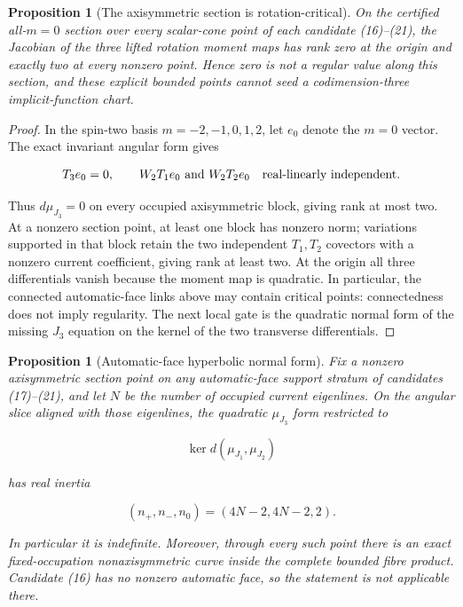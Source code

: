 \documentclass[11pt]{article}
\newtheorem{proposition}[theorem]{Proposition}
\theoremstyle{definition}
\theoremstyle{remark}
\begin{document}
\begin{proposition}[The axisymmetric section is rotation-critical]
On the certified all-\(m=0\) section over every scalar-cone point of each
candidate (16)--(21), the Jacobian of the three lifted rotation moment maps
has rank zero at the origin and exactly two at every nonzero point.  Hence
zero is not a regular value along this section, and these explicit bounded
points cannot seed a codimension-three implicit-function chart.
\end{proposition}

\begin{proof}
In the spin-two basis \(m=-2,-1,0,1,2\), let \(e_0\) denote the \(m=0\)
vector.  The exact invariant angular form gives

\[
 T_3e_0=0,
 \qquad
 W_2T_1e_0\ \hbox{and}\ W_2T_2e_0
 \quad\hbox{real-linearly independent}.
\]

Thus \(d\mu_{J_3}=0\) on every occupied axisymmetric block, giving rank at
most two.  At a nonzero section point, at least one block has nonzero norm;
variations supported in that block retain the two independent \(T_1,T_2\)
covectors with a nonzero current coefficient, giving rank at least two.  At
the origin all three differentials vanish because the moment map is
quadratic.  In particular, the connected automatic-face links above may
contain critical points: connectedness does not imply regularity.  The next
local gate is the quadratic normal form of the missing \(J_3\) equation on
the kernel of the two transverse differentials.
\end{proof}

\begin{proposition}[Automatic-face hyperbolic normal form]
Fix a nonzero axisymmetric section point on any automatic-face support
stratum of candidates (17)--(21), and let \(N\) be the number of occupied
current eigenlines.  On the angular slice aligned with those eigenlines, the
quadratic \(\mu_{J_3}\) form restricted to

\[
 \ker d(\mu_{J_1},\mu_{J_2})
\]

has real inertia

\[
 (n_+,n_-,n_0)=(4N-2,4N-2,2).
\]

In particular it is indefinite.  Moreover, through every such point there
is an exact fixed-occupation nonaxisymmetric curve inside the complete
bounded fibre product.  Candidate (16) has no nonzero automatic face, so the
statement is not applicable there.
\end{proposition}
\end{document}
